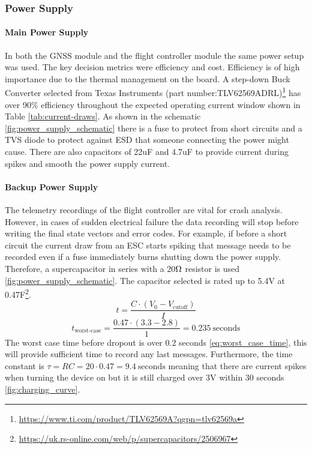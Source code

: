\subsubsection{Power Supply}\label{sub_sub_section:tgt_power_supply}

\paragraph{Main Power Supply}
In both the GNSS module and the flight controller module the same power setup was used. The key decision metrics were efficiency and cost.  Efficiency is of high importance due to the thermal management on the board. A step-down Buck Converter selected from Texas Instruments (part number:TLV62569ADRL)\footnote{\url{https://www.ti.com/product/TLV62569A?qgpn=tlv62569a}} has over 90\% efficiency throughout the expected operating current window shown in Table \ref{tab:current-draws}. As shown in the schematic \ref{fig:power_supply_schematic} there is a fuse to protect from short circuits and a \gls{TVS} diode to protect against \gls{ESD} that someone connecting the power might cause. There are also capacitors of 22uF and 4.7uF to provide current during spikes and smooth the power supply current.

\paragraph{Backup Power Supply}
The telemetry recordings of the flight controller are vital for crash analysis. However, in cases of sudden electrical failure the data recording will stop before writing the final state vectors and error codes. For example, if before a short circuit the current draw from an \gls{ESC} starts spiking that message needs to be recorded even if a fuse immediately burns shutting down the power supply. Therefore, a supercapacitor in series with a 20$\ohm$ resistor is used \ref{fig:power_supply_schematic}. The capacitor selected is rated up to 5.4V at 0.47F\footnote{\url{https://uk.rs-online.com/web/p/supercapacitors/2506967}}. 
\begin{equation}
t = \frac{C \cdot (V_0 - V_{\text{cutoff}})}{I}
\label{eq:discharge_time}
\end{equation}
\begin{equation}
t_{\text{worst-case}} = \frac{0.47 \cdot (3.3 - 2.8)}{1} = 0.235\ \text{seconds}
\label{eq:worst_case_time}
\end{equation}
The worst case time before dropout is over 0.2 seconds \ref{eq:worst_case_time}, this will provide sufficient time to record any last messages. Furthermore, the time constant is $\tau = RC = 20 \cdot 0.47 = 9.4\ \text{seconds}$ meaning that there are current spikes when turning the device on but it is still charged over 3V within 30 seconds \ref{fig:charging_curve}.

